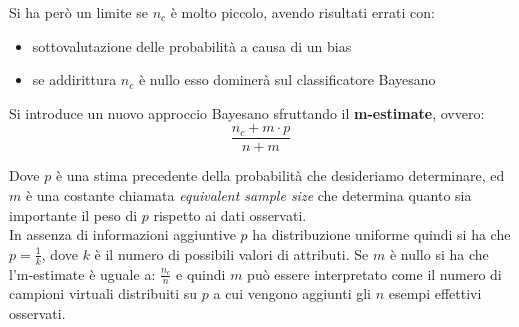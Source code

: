 Si ha però un limite se $n_c$ è molto piccolo, avendo risultati errati con:
\begin{itemize}
    \item sottovalutazione delle probabilità a causa di un bias
    \item se addirittura $n_c$ è nullo esso dominerà sul classificatore Bayesano 
\end{itemize}

Si introduce un nuovo approccio Bayesano sfruttando il \textbf{m-estimate}, ovvero: 
\[\frac{n_c+m\cdot p}{n+m}\]

Dove $p$ è una stima precedente della probabilità che desideriamo determinare, ed $m$ è una costante chiamata \textit{equivalent sample size} che determina quanto sia importante il peso di $p$ rispetto ai dati osservati.\\ 
In assenza di informazioni aggiuntive $p$ ha distribuzione uniforme quindi si ha che $p=\frac{1}{k}$, dove $k$ è il numero di possibili valori di attributi. Se $m$ è nullo si ha che l'm-estimate è uguale a: $\frac{n_c}{n}$ e quindi $m$ può essere interpretato come il numero di campioni virtuali distribuiti su $p$ a cui vengono aggiunti gli $n$ esempi effettivi osservati.
